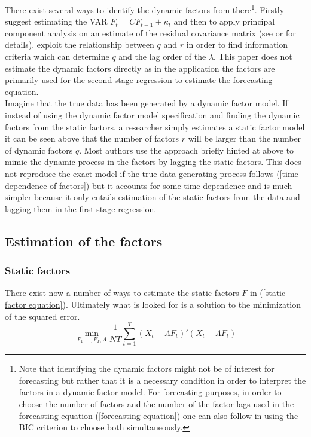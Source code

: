 \documentclass[12pt]{article}
\begin{document}
There exist several ways to identify the dynamic factors from there\footnote{Note that identifying the dynamic factors might not be of interest for forecasting but rather that it is a necessary condition in order to interpret the factors in a dynamic factor model. For forecasting purposes, in order to choose the number of factors and the number of the factor lags used in the forecasting equation (\ref{forecasting equation}) one can also follow \citet{bai2008forecasting} in using the BIC criterion to choose both simultaneously. }. Firstly \citet{giannone2002tracking} suggest estimating the VAR $F_t = C F_{t-1} + \kappa_t$ and then to apply principal component analysis on an estimate of the residual covariance matrix (see \citet{breitung2004identification} or \citet{giannone2002tracking} for details). \citet{breitung2004identification} exploit the relationship between $q$ and $r$ in order to find information criteria which can determine $q$ and the lag order of the $\lambda$. This paper does not estimate the dynamic factors directly as in the application the factors are primarily used for the second stage regression to estimate the forecasting equation. \\

Imagine that the true data has been generated by a dynamic factor model. If instead of using the dynamic factor model specification and finding the dynamic factors from the static factors, a researcher simply estimates a static factor model it can be seen above that the number of factors $r$ will be larger than the number of dynamic factors $q$. Most authors use the approach briefly hinted at above to mimic the dynamic process in the factors by lagging the static factors. This does not reproduce the exact model if the true data generating process follows (\ref{time dependence of factors}) but it accounts for some time dependence and is much simpler because it only entails estimation of the static factors from the data and lagging them in the first stage regression.

\subsection{Estimation of the factors}
\subsubsection{Static factors}
There exist now a number of ways to estimate the static factors $F$ in (\ref{static factor equation}). Ultimately what is looked for is a solution to the minimization of the squared error.
\begin{equation}
	\label{factor equation minimization problem}
	\min_{F_1, ..., F_T, \Lambda} \frac{1}{NT} \sum_{t=1}^T (X_t - \Lambda F_t)'(X_t - \Lambda F_t)
\end{equation}
\end{document}

